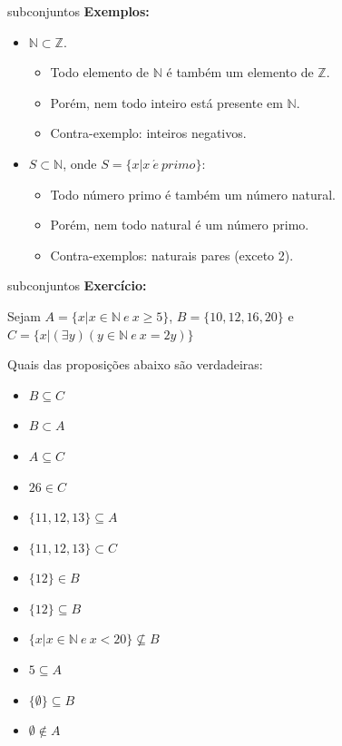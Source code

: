 \documentclass[aspectratio=169]{beamer}
\begin{document}
\begin{frame}{subconjuntos}
    \textbf{Exemplos:}
    \vspace{4mm}

    \begin{itemize}
        \item $\mathbb{N} \subset \mathbb{Z}$.
        \begin{itemize}
            \item Todo elemento de $\mathbb{N}$ é também um elemento de $\mathbb{Z}$.
            \item Porém, nem todo inteiro está presente em $\mathbb{N}$.
            \item Contra-exemplo: inteiros negativos. 
        \end{itemize}

        \item $S \subset \mathbb{N}$, onde $S = \{ x | x ~ \acute{e} ~ primo\}$:
        \begin{itemize}
            \item Todo número primo é também um número natural.
            \item Porém, nem todo natural é um número primo.
            \item Contra-exemplos: naturais pares (exceto 2).
        \end{itemize}
    \end{itemize}
    
\end{frame}

\begin{frame}{subconjuntos}
    \textbf{Exercício:}
    \vspace{4mm}

    Sejam $A = \{x | x \in \mathbb{N} ~ e ~ x \geq 5\}$, $B = \{10, 12, 16, 20\}$ e $C = \{x | (\exists y)(y \in \mathbb{N} ~ e ~ x = 2y)\}$

    Quais das proposições abaixo são verdadeiras:
    
    \begin{multicols}{2}
        \begin{itemize}
            \item $B \subseteq C$
            \item $B \subset A$
            \item $A \subseteq C$
            \item $26 \in C$
            \item $\{11, 12, 13\} \subseteq A$
            \item $\{11, 12, 13\} \subset C$
            \item $\{12\} \in B$
            \item $\{12\} \subseteq B$
            \item $\{x | x \in \mathbb{N} ~ e ~ x < 20\} \nsubseteq B$
            \item $5 \subseteq A$
            \item $\{\emptyset\} \subseteq B$
            \item $\emptyset \notin A$
        \end{itemize}
    \end{multicols}
\end{frame}
\end{document}
